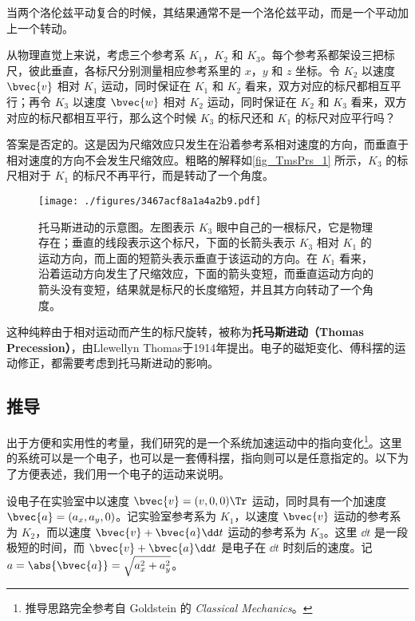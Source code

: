 

当两个洛伦兹平动复合的时候，其结果通常不是一个洛伦兹平动，而是一个平动加上一个转动。

从物理直觉上来说，考虑三个参考系 $K_1$，$K_2$ 和 $K_3$。每个参考系都架设三把标尺，彼此垂直，各标尺分别测量相应参考系里的 $x$，$y$ 和 $z$ 坐标。令 $K_2$ 以速度 $\bvec{v}$ 相对 $K_1$ 运动，同时保证在 $K_1$ 和 $K_2$ 看来，双方对应的标尺都相互平行；再令 $K_3$ 以速度 $\bvec{w}$ 相对 $K_2$ 运动，同时保证在 $K_2$ 和 $K_3$ 看来，双方对应的标尺都相互平行，那么这个时候 $K_3$ 的标尺还和 $K_1$ 的标尺对应平行吗？

答案是否定的。这是因为尺缩效应只发生在沿着参考系相对速度的方向，而垂直于相对速度的方向不会发生尺缩效应。粗略的解释如\autoref{fig_TmsPrs_1} 所示，$K_3$ 的标尺相对于 $K_1$ 的标尺不再平行，而是转动了一个角度。

\begin{figure}[ht]
\centering
\texttt{[image: ./figures/3467acf8a1a4a2b9.pdf]}
\caption{托马斯进动的示意图。左图表示 $K_3$ 眼中自己的一根标尺，它是物理存在；垂直的线段表示这个标尺，下面的长箭头表示 $K_3$ 相对 $K_1$ 的运动方向，而上面的短箭头表示垂直于该运动的方向。在 $K_1$ 看来，沿着运动方向发生了尺缩效应，下面的箭头变短，而垂直运动方向的箭头没有变短，结果就是标尺的长度缩短，并且其方向转动了一个角度。} \label{fig_TmsPrs_1}
\end{figure}

这种纯粹由于相对运动而产生的标尺旋转，被称为\textbf{托马斯进动（Thomas Precession）}，由Llewellyn Thomas于1914年提出。电子的磁矩变化、傅科摆的运动修正，都需要考虑到托马斯进动的影响。

\subsection{推导}

出于方便和实用性的考量，我们研究的是一个系统加速运动中的指向变化\footnote{推导思路完全参考自 Goldstein 的 \textsl{Classical Mechanics}\cite{Goldstein}。}。这里的系统可以是一个电子，也可以是一套傅科摆，指向则可以是任意指定的。以下为了方便表述，我们用一个电子的运动来说明。

设电子在实验室中以速度 $\bvec{v}=(v, 0, 0)\Tr$ 运动，同时具有一个加速度 $\bvec{a}=(a_x, a_y, 0)$。记实验室参考系为 $K_1$，以速度 $\bvec{v}$ 运动的参考系为 $K_2$，而以速度 $\bvec{v}+\bvec{a}\dd t$ 运动的参考系为 $K_3$。这里 $\dd t$ 是一段极短的时间，而 $\bvec{v}+\bvec{a}\dd t$ 是电子在 $\dd t$ 时刻后的速度。记 $a=\abs{\bvec{a}}=\sqrt{a_x^2+a_y^2}$。


